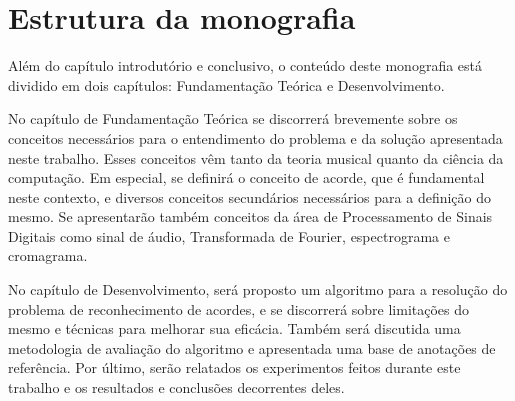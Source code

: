 
\section{Estrutura da monografia}
    Além do capítulo introdutório e conclusivo, o conteúdo deste monografia está dividido em dois capítulos: Fundamentação Teórica e Desenvolvimento.
    
    No capítulo de Fundamentação Teórica se discorrerá brevemente sobre os conceitos necessários para o entendimento do problema e da solução apresentada neste trabalho. Esses conceitos vêm tanto da teoria musical quanto da ciência da computação. Em especial, se definirá o conceito de acorde, que é fundamental neste contexto, e diversos conceitos secundários necessários para a definição do mesmo. Se apresentarão também conceitos da área de Processamento de Sinais Digitais como sinal de áudio, Transformada de Fourier, espectrograma e cromagrama.
    
    No capítulo de Desenvolvimento, será proposto um algoritmo para a resolução do problema de reconhecimento de acordes, e se discorrerá sobre limitações do mesmo e técnicas para melhorar sua eficácia. Também será discutida uma metodologia de avaliação do algoritmo e apresentada uma base de anotações de referência. Por último, serão relatados os experimentos feitos durante este trabalho e os resultados e conclusões decorrentes deles.
    